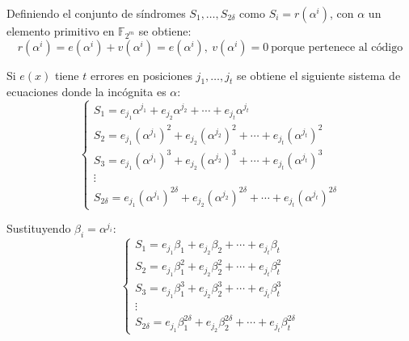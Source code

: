 \begin{itemize}
	Definiendo el conjunto de síndromes \({S_1,\ldots , S_{2\delta}}\) como \(S_i=r(\alpha^i)\), con $\alpha$ un elemento primitivo en \(\mathbb{F}_{2^m}\) se obtiene:
	\begin{equation}
		r(\alpha^i)=e(\alpha^i) +v(\alpha^i) = e(\alpha^i), \  v(\alpha^i)=0 \ \text{porque pertenece al código}
	\end{equation}
	
	Si \(e(x)\) tiene \(t\) errores en posiciones \(j_1,\ldots, j_t\) se obtiene el siguiente sistema de ecuaciones donde la incógnita es $\alpha$:
	\begin{equation}
		\begin{cases}
			S_1 = e_{j_1} \alpha^{j_1} + e_{j_2} \alpha^{j_2} + \cdots + e_{j_t} \alpha^{j_t} \\
			S_2 = e_{j_1} (\alpha^{j_1})^2 + e_{j_2} (\alpha^{j_2})^2 + \cdots + e_{j_t} (\alpha^{j_t})^2 \\
			S_3 = e_{j_1} (\alpha^{j_1})^3 + e_{j_2} (\alpha^{j_2})^3 + \cdots + e_{j_t} (\alpha^{j_t})^3 \\
			\vdots \\
			S_{2\delta} = e_{j_1} (\alpha^{j_1})^{2\delta} + e_{j_2} (\alpha^{j_2})^{2\delta} + \cdots + e_{j_t} (\alpha^{j_t})^{2\delta}
		\end{cases}
	\end{equation}
	
	Sustituyendo $\beta_i=\alpha^{j_i}$:
		\begin{equation}
		\begin{cases}
			S_1 = e_{j_1} \beta_1 + e_{j_2} \beta_2 + \cdots + e_{j_t} \beta_t \\
			S_2 = e_{j_1} \beta_1^2 + e_{j_2} \beta_2^2 + \cdots + e_{j_t} \beta_t^2 \\
			S_3 = e_{j_1} \beta_1^3 + e_{j_2} \beta_2^3 + \cdots + e_{j_t} \beta_t^3 \\
			\vdots \\
			S_{2\delta} = e_{j_1} \beta_1^{2\delta} + e_{j_2} \beta_2^{2\delta} + \cdots + e_{j_t} \beta_t^{2\delta}
		\end{cases}
	\end{equation}
	

\end{itemize}
